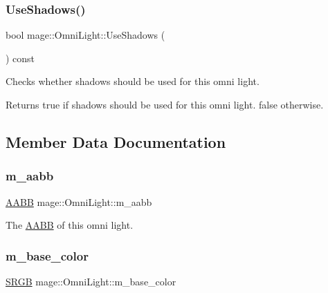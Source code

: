 \subsubsection{\texorpdfstring{Use\+Shadows()}{UseShadows()}}
{\footnotesize\ttfamily bool mage\+::\+Omni\+Light\+::\+Use\+Shadows (\begin{DoxyParamCaption}{ }\end{DoxyParamCaption}) const\hspace{0.3cm}{\ttfamily [noexcept]}}

Checks whether shadows should be used for this omni light.

\begin{DoxyReturn}{Returns}
{\ttfamily true} if shadows should be used for this omni light. {\ttfamily false} otherwise. 
\end{DoxyReturn}


\subsection{Member Data Documentation}
\hypertarget{classmage_1_1_omni_light_a9563f91a80b35fd4f9a7f73721457a8a}{}\label{classmage_1_1_omni_light_a9563f91a80b35fd4f9a7f73721457a8a} 
\subsubsection{\texorpdfstring{m\+\_\+aabb}{m\_aabb}}
{\footnotesize\ttfamily \hyperlink{classmage_1_1_a_a_b_b}{A\+A\+BB} mage\+::\+Omni\+Light\+::m\+\_\+aabb\hspace{0.3cm}{\ttfamily [private]}}

The \hyperlink{classmage_1_1_a_a_b_b}{A\+A\+BB} of this omni light. \hypertarget{classmage_1_1_omni_light_ae48ee8d67341912519d793ec76269ab3}{}\label{classmage_1_1_omni_light_ae48ee8d67341912519d793ec76269ab3} 
\subsubsection{\texorpdfstring{m\+\_\+base\+\_\+color}{m\_base\_color}}
{\footnotesize\ttfamily \hyperlink{structmage_1_1_s_r_g_b}{S\+R\+GB} mage\+::\+Omni\+Light\+::m\+\_\+base\+\_\+color\hspace{0.3cm}{\ttfamily [private]}}

